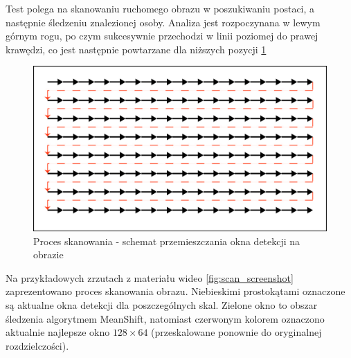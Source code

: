 Test polega na skanowaniu ruchomego obrazu w poszukiwaniu postaci, a następnie śledzeniu znalezionej osoby. Analiza jest rozpoczynana w lewym górnym rogu, po czym sukcesywnie przechodzi w linii poziomej do prawej krawędzi, co jest następnie powtarzane dla niższych pozycji \ref{fig:scan_scheme} %
\begin{figure}[h]
	\centering
	\includegraphics[width=12cm]{6_scanning.jpg}
	\caption{Proces skanowania - schemat przemieszczania okna detekcji na obrazie}
	\label{fig:scan_scheme}
\end{figure}
Na przykładowych zrzutach z materiału wideo \ref{fig:scan_screenshot} zaprezentowano proces skanowania obrazu. 
Niebieskimi prostokątami oznaczone są aktualne okna detekcji dla poszczególnych skal. 
Zielone okno to obszar śledzenia algorytmem MeanShift, natomiast czerwonym kolorem oznaczono aktualnie najlepsze okno $128 \times 64$ (przeskalowane ponownie do oryginalnej rozdzielczości).

